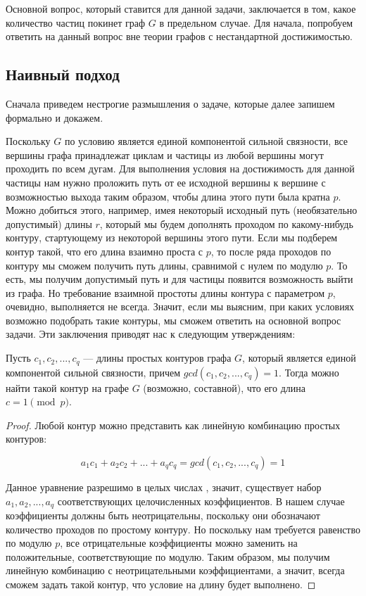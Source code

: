 Основной вопрос, который ставится для данной задачи, заключается в том, какое количество частиц покинет граф $G$ в предельном случае. Для начала, попробуем ответить на данный вопрос вне теории графов с нестандартной достижимостью. 

\subsection{Наивный подход}

Сначала приведем нестрогие размышления о задаче, которые далее запишем формально и докажем. 

Поскольку $G$ по условию является единой компонентой сильной связности, все вершины графа принадлежат циклам и частицы из любой вершины могут проходить по всем дугам. Для выполнения условия на достижимость для данной частицы нам нужно проложить путь от ее исходной вершины к вершине с возможностью выхода таким образом, чтобы длина этого пути была кратна $p$. Можно добиться этого, например, имея некоторый исходный путь (необязательно допустимый) длины $r$, который мы будем дополнять проходом по какому-нибудь контуру, стартующему из некоторой вершины этого пути. Если мы подберем контур такой, что его длина взаимно проста с $p$, то после ряда проходов по контуру мы сможем получить путь длины, сравнимой с нулем по модулю $p$. То есть, мы получим допустимый путь и для частицы появится возможность выйти из графа. Но требование взаимной простоты длины контура с параметром $p$, очевидно, выполняется не всегда. Значит, если мы выясним, при каких условиях возможно подобрать такие контуры, мы сможем ответить на основной вопрос задачи. Эти заключения приводят нас к следующим утверждениям:

\begin{lemma}
	Пусть $c_1, c_2, ... , c_q $ --- длины простых контуров графа $G$, который является единой компонентой сильной связности, причем $gcd(c_1, c_2, ... , c_q) = 1$. Тогда можно найти такой контур на графе $G$ (возможно, составной), что его длина $c = 1\pmod p$.
\end{lemma}

\begin{proof}
	Любой контур можно представить как линейную комбинацию простых контуров: 
	
	\begin{equation*}
	a_1c_1 + a_2c_2 + ... + a_qc_q = gcd(c_1, c_2, ... , c_q) = 1
	\end{equation*}
	
	Данное уравнение разрешимо в целых числах \cite{Hasse}, значит, существует набор $a_1, a_2, ... , a_q$ соответствующих целочисленных коэффициентов. В нашем случае коэффициенты должны быть неотрицательны, поскольку они обозначают количество проходов по простому контуру. Но поскольку нам требуется равенство по модулю $p$, все отрицательные коэффициенты можно заменить на положительные, соответствующие по модулю. Таким образом, мы получим линейную комбинацию с неотрицательными коэффициентами, а значит, всегда сможем задать такой контур, что условие на длину будет выполнено. 
\end{proof}


